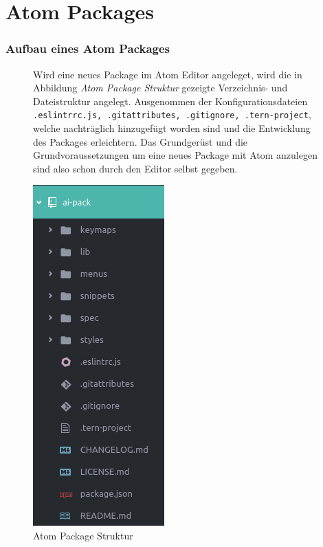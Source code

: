\part{Atom Packages}
\section{Aufbau eines Atom Packages}
    \begin{figure}[H]
        \begin{minipage}{0.6\textwidth}
            Wird eine neues Package im Atom Editor angeleget, wird die in Abbildung \textit{Atom Package Struktur} gezeigte Verzeichnis- und Dateistruktur angelegt. Ausgenommen der Konfigurationsdateien \texttt{.eslintrrc.js, .gitattributes, .gitignore, .tern-project}, welche nachträglich hinzugefügt worden sind und die Entwicklung des Packages erleichtern. Das Grundgerüst und die Grundvoraussetzungen um eine neues Package mit Atom anzulegen sind also schon durch den Editor selbst gegeben.
        \end{minipage}
        \begin{minipage}{0.4\textwidth}
            \centering
            \includegraphics[scale=0.5]{img/package_structure.png}
            \caption{Atom Package Struktur}
        \end{minipage}
    \end{figure}

